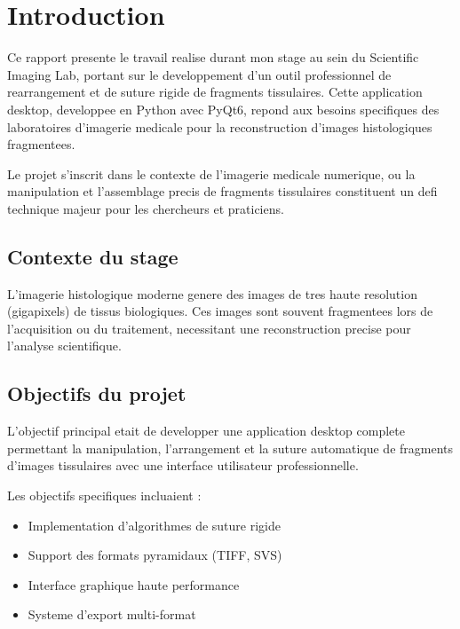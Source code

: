 \documentclass[12pt,a4paper]{article}
\begin{document}
\section{Introduction}

Ce rapport presente le travail realise durant mon stage au sein du Scientific Imaging Lab, portant sur le developpement d'un outil professionnel de rearrangement et de suture rigide de fragments tissulaires. Cette application desktop, developpee en Python avec PyQt6, repond aux besoins specifiques des laboratoires d'imagerie medicale pour la reconstruction d'images histologiques fragmentees.

Le projet s'inscrit dans le contexte de l'imagerie medicale numerique, ou la manipulation et l'assemblage precis de fragments tissulaires constituent un defi technique majeur pour les chercheurs et praticiens.

\subsection{Contexte du stage}

L'imagerie histologique moderne genere des images de tres haute resolution (gigapixels) de tissus biologiques. Ces images sont souvent fragmentees lors de l'acquisition ou du traitement, necessitant une reconstruction precise pour l'analyse scientifique.

\subsection{Objectifs du projet}

L'objectif principal etait de developper une application desktop complete permettant la manipulation, l'arrangement et la suture automatique de fragments d'images tissulaires avec une interface utilisateur professionnelle.

Les objectifs specifiques incluaient :
\begin{itemize}
\item Implementation d'algorithmes de suture rigide
\item Support des formats pyramidaux (TIFF, SVS)
\item Interface graphique haute performance
\item Systeme d'export multi-format
\end{itemize}
\end{document}
